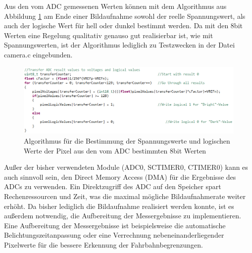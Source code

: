 
Aus den vom ADC gemessenen Werten können mit dem Algorithmus aus Abbildung \ref{fig:PixelCalc} am Ende einer Bildaufnahme sowohl der reelle Spannungswert, als auch der logische Wert für hell oder dunkel bestimmt werden. Da mit den 8bit Werten eine Regelung qualitativ genauso gut realisierbar ist, wie mit Spannungswerten, ist der Algorithmus lediglich zu Testzwecken in der Datei \glqq{}camera.c\grqq{} eingebunden.

\begin{figure}[H] %
\includegraphics[width=.95\textwidth]{sec7/images/code/PixelCalc} 
\centering
\captionsetup{width=.95\textwidth}
\caption[Algorithmus für die Bestimmung der Spannungswerte und logischen Werte der Pixel]{Algorithmus für die Bestimmung der Spannungswerte und logischen Werte der Pixel aus den vom ADC bestimmten 8bit Werten}\centering
\label{fig:PixelCalc}
\end{figure}

Außer der bisher verwendeten Module (ADC0, SCTIMER0, CTIMER0) kann es auch sinnvoll sein, den Direct Memory Access (DMA) für die Ergebnisse des ADCs zu verwenden. Ein Direktzugriff des ADC auf den Speicher spart Rechenressourcen und Zeit, was die maximal mögliche Bildaufnahmerate weiter erhöht. Da bisher lediglich die Bildaufnahme realisiert werden konnte, ist es außerdem notwendig, die Aufbereitung der Messergebnisse zu implementieren. Eine Aufbereitung der Messergebnisse ist beispielsweise die automatische Belichtungszeitanpassung oder eine Verrechnung nebeneinanderliegender Pixelwerte für die bessere Erkennung der Fahrbahnbegrenzungen.


